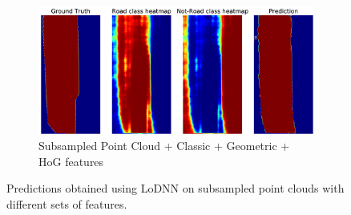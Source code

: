 \documentclass[10pt,twocolumn,letterpaper]{article}
\begin{document}
\begin{figure}[!th]
  \begin{subfigure}[b]{\columnwidth}
    \includegraphics[width=\columnwidth]{pred_classic_geom_sub_hog.png}
    \caption{Subsampled Point Cloud + Classic + Geometric + HoG features}
  \end{subfigure}
 
  \caption{Predictions obtained using LoDNN on subsampled point clouds with different sets of features.}
  \label{fig:sub_results}
\end{figure}
\end{document}
